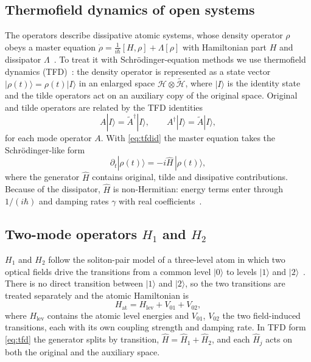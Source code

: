 \documentclass[conference]{IEEEtran}
\begin{document}
\subsection{Thermofield dynamics of open systems}\label{sec:tfd}
The operators describe dissipative atomic systems, whose density operator $\rho$ obeys a master equation $\dot\rho=\frac{1}{i\hbar}[H,\rho]+\Lambda[\rho]$ with Hamiltonian part $H$ and dissipator $\Lambda$~\cite{lindblad1976}. To treat it with Schr\"odinger-equation methods we use thermofield dynamics (TFD)~\cite{takahashi1975,patel2026,patel2025}: the density operator is represented as a state vector $|\rho(t)\rangle=\rho(t)|I\rangle$ in an enlarged space $\mathcal H\otimes\widetilde{\mathcal H}$, where $|I\rangle$ is the identity state and the tilde operators act on an auxiliary copy of the original space. Original and tilde operators are related by the TFD identities
\begin{equation}
A|I\rangle=\widetilde A^{\dagger}|I\rangle,\qquad A^{\dagger}|I\rangle=\widetilde A|I\rangle,
\label{eq:tfdid}
\end{equation}
for each mode operator $A$. With \eqref{eq:tfdid} the master equation takes the Schr\"odinger-like form
\begin{equation}
\partial_t|\rho(t)\rangle=-i\widehat H\,|\rho(t)\rangle,
\label{eq:tfd}
\end{equation}
where the generator $\widehat H$ contains original, tilde and dissipative contributions. Because of the dissipator, $\widehat H$ is non-Hermitian: energy terms enter through $1/(i\hbar)$ and damping rates $\gamma$ with real coefficients~\cite{ashida2020}.

\subsection{Two-mode operators \texorpdfstring{$H_1$ and $H_2$}{H1 and H2}}\label{sec:h12}
$H_1$ and $H_2$ follow the soliton-pair model of a three-level atom in which two optical fields drive the transitions from a common level $|0\rangle$ to levels $|1\rangle$ and $|2\rangle$~\cite{eleuch2003}. There is no direct transition between $|1\rangle$ and $|2\rangle$, so the two transitions are treated separately and the atomic Hamiltonian is
\begin{equation}
H_{\mathrm{at}}=H_{\mathrm{lev}}+V_{01}+V_{02},
\label{eq:Hat}
\end{equation}
where $H_{\mathrm{lev}}$ contains the atomic level energies and $V_{01}$, $V_{02}$ the two field-induced transitions, each with its own coupling strength and damping rate. In TFD form \eqref{eq:tfd} the generator splits by transition, $\widehat H=\widehat H_1+\widehat H_2$, and each $\widehat H_j$ acts on both the original and the auxiliary space.
\end{document}

